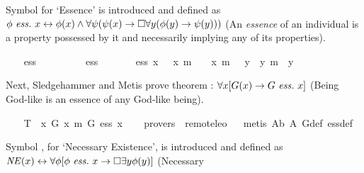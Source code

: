 \begin{isabellebody}
\begin{isamarkuptext}%
Symbol  for `Essence' is introduced and defined as 
$\phi \ \mathit{ess.} \ x \leftrightarrow \phi(x) \wedge \forall \psi (\psi(x) \rightarrow \Box \forall y (\phi(y) 
\rightarrow \psi(y)))$ (An \emph{essence} of an individual is a property possessed by it 
and necessarily implying any of its properties).%
\end{isamarkuptext}%
\isamarkuptrue%
\ \ \isamarkupfalse%
\ ess\ {\isacharcolon}{\isacharcolon}\ {\isachardoublequoteopen}{\isacharparenleft}{\isasymmu}\ {\isasymRightarrow}\ {\isasymsigma}{\isacharparenright}\ {\isasymRightarrow}\ {\isasymmu}\ {\isasymRightarrow}\ {\isasymsigma}{\isachardoublequoteclose}\ {\isacharparenleft}\ {\isachardoublequoteopen}ess{\isachardoublequoteclose}\ {}{}{\isacharparenright}\ \isanewline
\ \ \ \ {\isachardoublequoteopen}{\isasymPhi}\ ess\ x\ {\isacharequal}\ {\isasymPhi}\ x\ m{\isasymand}\ {\isasymPi}\ {\isacharparenleft}{\isasymlambda}{\isasympsi}{\isachardot}\ {\isasympsi}\ x\ m{\isasymRightarrow}\ {\isasymbox}\ {\isacharparenleft}{\isasymforall}\ {\isacharparenleft}{\isasymlambda}y{\isachardot}\ {\isasymPhi}\ y\ m{\isasymRightarrow}\ {\isasympsi}\ y{\isacharparenright}{\isacharparenright}{\isacharparenright}{\isachardoublequoteclose}%
\begin{isamarkuptext}%
Next, Sledgehammer and Metis prove theorem : $\forall x [G(x) \rightarrow G \ \mathit{ess.} \ x]$ 
(Being God-like is an essence of any God-like being).%
\end{isamarkuptext}%
\isamarkuptrue%
\ \ \isamarkupfalse%
\ T{}{\isacharcolon}\ {\isachardoublequoteopen}{\isacharbrackleft}{\isasymforall}\ {\isacharparenleft}{\isasymlambda}x{\isachardot}\ G\ x\ m{\isasymRightarrow}\ G\ ess\ x{\isacharparenright}{\isacharbrackright}{\isachardoublequoteclose}\isanewline
\ \ \isamarkupfalse%
\ {\isacharbrackleft}provers\ {\isacharequal}\ remote{\isacharunderscore}leo{}{\isacharbrackright}%
\isadelimproof
\ %
\endisadelimproof
%
\isatagproof
{}\isamarkupfalse%
\ {\isacharparenleft}metis\ A{}b\ A{}\ G{\isacharunderscore}def\ ess{\isacharunderscore}def{\isacharparenright}%
\endisatagproof
{\isafoldproof}%
%
\isadelimproof
%
\endisadelimproof
%
\begin{isamarkuptext}%
Symbol , for `Necessary Existence', is introduced and
defined as $\mathit{NE}(x) \leftrightarrow \forall \phi [\phi \ \mathit{ess.} \ x \rightarrow \Box \exists y \phi(y)]$ (Necessary 

\end{isamarkuptext}
\end{isabellebody}
